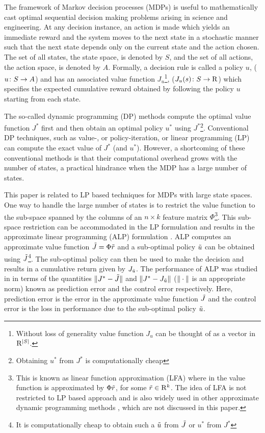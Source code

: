 The  framework of Markov decision processes (MDPs) is useful to mathematically cast optimal sequential decision making problems arising in science and engineering. At any decision instance, an action is made which yields an immediate reward and the system moves to the next state in a stochastic manner such that the next state depends only on the current state and the action chosen. The set of all states, the state space, is denoted by $S$, and the set of all actions, the action space, is denoted by $A$. Formally, a decision rule is called a policy $u$, ($u\colon S\rightarrow A$) and has an associated value function $J_u$\footnote{Without loss of generality value function $J_u$ can be thought of as a vector in $\mathrm{R}^{|S|}$.}, ($J_u(s)\colon S\rightarrow \mathrm{R}$) which specifies the expected cumulative reward obtained by following the policy $u$ starting from each state.\par
The so-called dynamic programming (DP) methods \cite{BertB} compute the optimal value function $J^*$ first and then obtain an optimal policy $u^*$ using $J^*$\footnote{Obtaining $u^*$ from $J^*$ is computationally cheap}. Conventional DP  techniques, such as value-, or policy-iteration, or linear programming (LP) \cite{BertB} can compute the exact value of $J^*$ (and $u^*$). However, a shortcoming of these conventional methods is that their computational overhead grows with the number of states, a practical hindrance when the MDP has a large number of states.\par
This paper is related to LP based techniques for MDPs with large state spaces. One way to handle the large number of states is to restrict the value function to the sub-space spanned by the columns of an $n\times k$ feature matrix $\Phi$\footnote{This is known as linear function approximation (LFA) where in the value function is approximated by $\Phi \tilde{r}$, for some $\tilde{r}\in \mathrm{R}^k$. The idea of LFA is not restricted to LP based approach and is also widely used in other approximate dynamic programming methods \cite{dpchapter}, which are not discussed in this paper.}. This sub-space restriction can be accommodated in the LP formulation and results in the approximate linear programming (ALP) formulation \cite{ALP,CS,SALP,ALP-Bor}. ALP computes an approximate value function $\tilde{J}=\Phi \tilde{r}$ and a sub-optimal policy $\tilde{u}$ can be obtained using $\tilde{J}$\footnote{It is computationally cheap to obtain such a $\tilde{u}$ from $\tilde{J}$ or $u^*$ from $J^*$}. The sub-optimal policy can then be used to make the decision and results in a cumulative return given by $J_{\tilde{u}}$. The performance of ALP was studied in \cite{ALP} in terms of the quantities $\|J^*-\tilde{J}\|$ and $\|J^*-J_{\tilde{u}}\|$ ($\|\cdot\|$ is an appropriate norm) known as prediction error and the control error respectively. Here, prediction error is the error in the approximate value function $\tilde{J}$ and the control error is the loss in performance due to the sub-optimal policy $\tilde{u}$.\par

